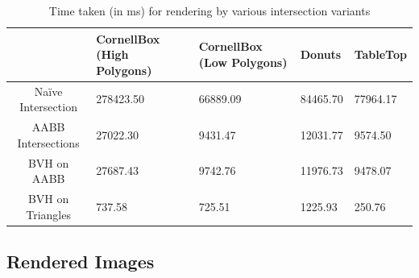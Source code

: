 \documentclass[a4paper]{article}
\begin{document}
\begin{table}[ht]
\centering
\renewcommand{\arraystretch}{1.5}
\begin{tabularx}{\linewidth}{cLLLL}
\hline
& CornellBox (High Polygons) & CornellBox (Low Polygons) & Donuts & TableTop \\
\hline
Na\"ive Intersection & 278423.50 & 66889.09 & 84465.70 & 77964.17 \\
AABB Intersections & 27022.30 & 9431.47 & 12031.77 & 9574.50 \\
BVH on AABB & 27687.43 & 9742.76 & 11976.73 & 9478.07 \\
BVH on Triangles & 737.58 & 725.51 & 1225.93 & 250.76 \\
\hline
\end{tabularx}
\caption{Time taken (in ms) for rendering by various intersection variants}
\end{table}

\pagebreak

\subsection{Rendered Images}
\end{document}
